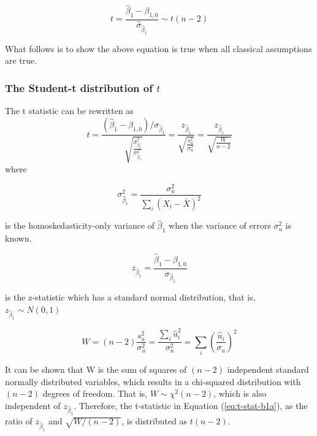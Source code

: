 \documentclass[a4paper,11pt]{article}
\begin{document}
\[ t = \frac{\hat{\beta}_1 -
\beta_{1,0}}{\hat{\sigma}_{\hat{\beta}_1}} \sim t(n-2) \]

What follows is to show the above equation is true when all classical
assumptions are true.

\subsubsection*{The Student-t distribution of \(t\)}
\label{sec:orgf395cee}

The t statistic can be rewritten as
\begin{equation}
\label{eq:t-stat-b1a}
t = \frac{(\hat{\beta}_1 - \beta_{1,0})/\sigma_{\hat{\beta}_1}}{\sqrt{\frac{\hat{\sigma}^2_{\hat{\beta}_1}}{\sigma^2_{\hat{\beta}_1}}}}
= \frac{z_{\hat{\beta}_1}}{\sqrt{\frac{s^2_u}{\sigma^2_u}}} = \frac{z_{\hat{\beta}_1}}{\sqrt{\frac{W}{n-2}}}
\end{equation}
where

\[\sigma^2_{\hat{\beta}_1} = \frac{\sigma^2_u}{\sum_i (X_i -
\bar{X})^2} \]

is the homoskedasticity-only variance of
\(\hat{\beta}_1\) when the variance of errors \(\sigma^2_u\) is known.

\[
z_{\hat{\beta}_1} =\frac{\hat{\beta}_1 -
\beta_{1,0}}{\sigma_{\hat{\beta}_1}}
\]

is the z-statistic which has a standard normal distribution, that is,
\(z_{\hat{\beta}_1} \sim N(0, 1)\)

\[
W = (n-2)\frac{s^2_u}{\sigma^2_u} =
\frac{\sum_i\hat{u}_i^2}{\sigma^2_u} = \sum_i
\left(\frac{\hat{u}_i}{\sigma_u}\right)^2
 \]

It can be shown that W is the sum of squares of \((n-2)\) independent
standard normally distributed variables, which results in a
chi-squared distribution with \((n-2)\) degrees of freedom. That is, \(W
\sim \chi^2(n-2)\), which is also independent of
\(z_{\hat{\beta}_1}\). Therefore, the t-statistic in Equation
(\ref{eq:t-stat-b1a}), as the ratio of \(z_{\hat{\beta}_1}\) and
\(\sqrt{W/(n-2)}\), is distributed as \(t(n-2)\).
\end{document}

